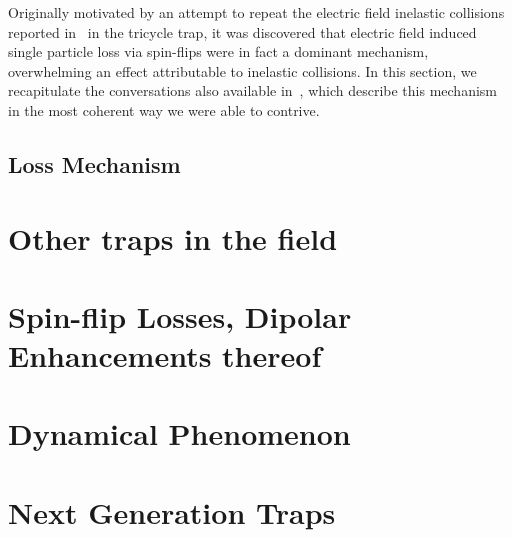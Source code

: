 \documentclass[defaultstyle,11pt]{thesis}
\begin{document}
Originally motivated by an attempt to repeat the electric field inelastic collisions reported in~\cite{stuhl2013} in the tricycle trap, it was discovered that electric field induced single particle loss via spin-flips were in fact a dominant mechanism, overwhelming an effect attributable to inelastic collisions.
In this section, we recapitulate the conversations also available in~\cite{reens2017}, which describe this mechanism in the most coherent way we were able to contrive.

\subsection{Loss Mechanism}

\section{Other traps in the field}

\section{Spin-flip Losses, Dipolar Enhancements thereof}

\section{Dynamical Phenomenon}

\section{Next Generation Traps}



\end{document}
